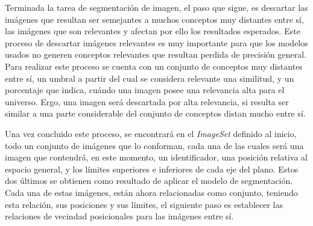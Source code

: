 Terminada la tarea de segmentaci\'on de imagen, el paso que sigue, es descartar las imágenes que resultan ser semejantes a muchos conceptos muy distantes entre sí, las imágenes que son relevantes y afectan por ello los resultados esperados. Este proceso de descartar imágenes relevantes es muy importante para que los modelos usados no generen conceptos relevantes que resultan perdida de precisi\'on general. Para realizar este proceso se cuenta con un conjunto de conceptos muy distantes entre sí, un umbral a partir del cual se considera relevante una similitud, y un porcentaje que indica, cu\'ando una imagen posee una relevancia alta para el universo. Ergo, una imagen ser\'a descartada por alta relevancia, si resulta ser similar a una parte considerable del conjunto de conceptos distan mucho entre s\'i.

Una vez concluido este proceso, se encontrará en el \textit{ImageSet} definido al inicio, todo un conjunto de imágenes que lo conforman, cada una de las cuales será una imagen que contendrá, en este momento, un identificador, una posición relativa al espacio general, y los límites superiores e inferiores de cada eje del plano. Estos dos últimos se obtienen como resultado de aplicar el modelo de segmentación. Cada una de estas imágenes, están ahora relacionadas como conjunto, teniendo esta relación, sus posiciones y sus límites, el siguiente paso es establecer las relaciones de vecindad posicionales para las imágenes entre s\'i.

